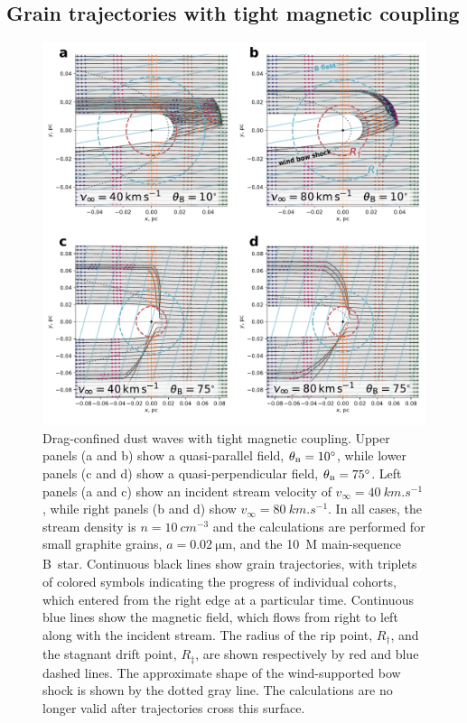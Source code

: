 \subsection{Grain trajectories with tight magnetic coupling}
\label{sec:grain-traj-with}

\begin{figure}
  \centering
  \includegraphics[width=\linewidth]{figs/frozen-stream-map-multi}
  \caption{Drag-confined dust waves with tight magnetic coupling.
    Upper panels (a and b) show a quasi-parallel field,
    \(\theta_{\scriptscriptstyle\text{B}} = \ang{10}\), while lower panels (c and d) show a
    quasi-perpendicular field, \(\theta_{\scriptscriptstyle\text{B}} = \ang{75}\).  Left panels (a and
    c) show an incident stream velocity of
    \(v_\infty = \SI{40}{km.s^{-1}}\), while right panels (b and d) show
    \(v_\infty = \SI{80}{km.s^{-1}}\).  In all cases, the stream density is
    \(n = \SI{10}{cm^{-3}}\) and the calculations are performed for
    small graphite grains, \(a = \SI{0.02}{\um}\), and the
    \SI{10}{M_\odot} main-sequence B~star.  Continuous black lines show
    grain trajectories, with triplets of colored symbols indicating
    the progress of individual cohorts, which entered from the right
    edge at a particular time.  Continuous blue lines show the
    magnetic field, which flows from right to left along with the
    incident stream.  The radius of the rip point, \(R_\dag\), and the
    stagnant drift point, \(R_\ddag\), are shown respectively by red and
    blue dashed lines.  The approximate shape of the wind-supported
    bow shock is shown by the dotted gray line.  The calculations are
    no longer valid after trajectories cross this surface.}
  \label{fig:frozen-stream}
\end{figure}

